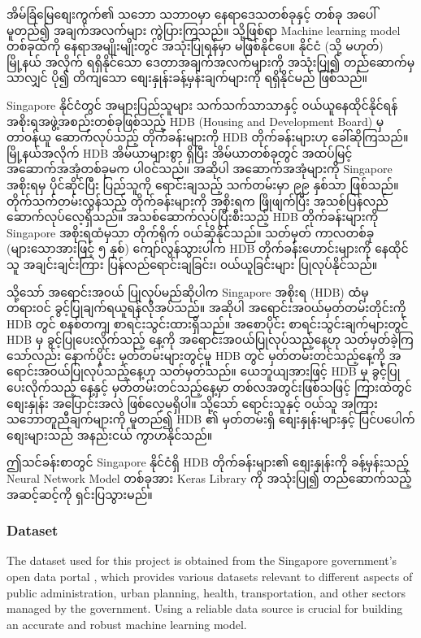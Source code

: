 အိမ်ခြံမြေစျေးကွက်၏ သဘော သဘာ၀မှာ နေရာဒေသတစ်ခုနှင့် တစ်ခု အပေါ်မူတည်၍ အချက်အလက်များ ကွဲပြားကြသည်။ သို့ဖြစ်ရာ Machine learning model တစ်ခုထဲကို နေရာအမျိုးမျိုးတွင် အသုံးပြုရန်မှာ မဖြစ်နိုင်ပေ။ နိုင်ငံ (သို့ မဟုတ်) မြို့နယ် အလိုက် ရရှိနိုင်သော ဒေတာအချက်အလက်များကို အသုံးပြု၍ တည်ဆောက်မှသာလျှင် ပို၍ တိကျသော စျေးနှုန်းခန့်မှန်းချက်များကို ရရှိနိုင်မည် ဖြစ်သည်။ 

Singapore နိုင်ငံတွင် အများပြည်သူများ သက်သက်သာသာနှင့် ၀ယ်ယူနေထိုင်နိုင်ရန် အစိုးရအဖွဲ့အစည်းတစ်ခုဖြစ်သည့် HDB (Housing and Development Board) မှ တာ၀န်ယူ ဆောက်လုပ်သည့် တိုက်ခန်းများကို HDB တိုက်ခန်းများဟု ခေါ်ဆိုကြသည်။ မြို့နယ်အလိုက်  HDB အိမ်ယာများစွာ ရှိပြီး အိမ်ယာတစ်ခုတွင် အထပ်မြင့် အဆောက်အအုံတစ်ခုမက ပါ၀င်သည်။ အဆိုပါ အဆောက်အအုံများကို Singapore အစိုးရမှ ပိုင်ဆိုင်ပြီး ပြည်သူကို ရောင်းချသည့် သက်တမ်းမှာ ၉၉ နှစ်သာ ဖြစ်သည်။ တိုက်သက်တမ်းလွန်သည့် တိုက်ခန်းများကို အစိုးရက ဖြိုဖျက်ပြီး အသစ်ပြန်လည်ဆောက်လုပ်လေ့ရှိသည်။ အသစ်ဆောက်လုပ်ပြီးစီးသည့် HDB တိုက်ခန်းများကို Singapore အစိုးရထံမှသာ တိုက်ရိုက် ၀ယ်ဆိုနိုင်သည်။ သတ်မှတ် ကာလတစ်ခု  (များသောအားဖြင့် ၅ နှစ်) ကျော်လွန်သွားပါက HDB တိုက်ခန်းဟောင်းများကို နေထိုင်သူ အချင်းချင်းကြား ပြန်လည်ရောင်းချခြင်း၊ ၀ယ်ယူခြင်းများ ပြုလုပ်နိုင်သည်။ 

သို့သော် အရောင်းအ၀ယ် ပြုလုပ်မည်ဆိုပါက Singapore အစိုးရ (HDB) ထံမှ တရား၀င် ခွင့်ပြုချက်ရယူရန်လိုအပ်သည်။ အဆိုပါ အရောင်းအ၀ယ်မှတ်တမ်းတိုင်းကို HDB တွင် စနစ်တကျ စာရင်းသွင်းထားရှိသည်။ အစောပိုင်း စာရင်းသွင်းချက်များတွင် HDB မှ ခွင့်ပြုပေးလိုက်သည့် နေ့ကို အရောင်းအ၀ယ်ပြုလုပ်သည့်နေ့ဟု သတ်မှတ်ခဲ့ကြသော်လည်း နောက်ပိုင်း မှတ်တမ်းများတွင်မူ HDB တွင် မှတ်တမ်းတင်သည့်နေ့ကို အရောင်းအ၀ယ်ပြုလုပ်သည့်နေ့ဟု သတ်မှတ်သည်။ ယေဘူယျအားဖြင့်  HDB မှ ခွင့်ပြုပေးလိုက်သည့် နေ့နှင့် မှတ်တမ်းတင်သည့်နေ့မှာ တစ်လအတွင်းဖြစ်သဖြင့် ကြားထဲတွင် စျေးနှုန်း အပြောင်းအလဲ ဖြစ်လေ့မရှိပါ။ သို့သော် ရောင်းသူနှင့် ၀ယ်သူ အကြားသဘောတူညီချက်များကို မူတည်၍ HDB ၏ မှတ်တမ်းရှိ စျေးနှုန်းများနှင့် ပြင်ပပေါက်စျေးများသည် အနည်းငယ် ကွာဟနိုင်သည်။ 

ဤသင်ခန်းစာတွင် Singapore နိုင်ငံရှိ HDB တိုက်ခန်းများ၏ စျေးနှုန်းကို ခန့်မှန်းသည့် Neural Network Model တစ်ခုအား Keras Library ကို အသုံးပြု၍ တည်ဆောက်သည့် အဆင့်ဆင့်ကို ရှင်းပြသွားမည်။ 

\subsubsection{Dataset}

The dataset used for this project is obtained from the Singapore government's open data portal \cite{web:SGdata}, which provides various datasets relevant to different aspects of public administration, urban planning, health, transportation, and other sectors managed by the government. Using a reliable data source is crucial for building an accurate and robust machine learning model.

